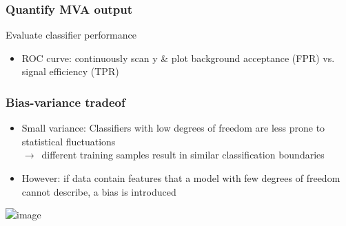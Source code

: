 \documentclass{beamer}
\begin{document}

\begin{frame}
    \frametitle{Quantify MVA output}
    \begin{block}{Evaluate classifier performance}
        \begin{itemize}
            \item ROC curve: continuously scan y \& plot background acceptance (FPR) vs. signal efficiency (TPR)
                
        \end{itemize}
    \end{block}
    \vspace*{2mm}
    \centering{}
\end{frame}


\begin{frame}
    \frametitle{Bias-variance tradeof}
    \begin{itemize}
        \item Small variance: Classifiers with low degrees of freedom are less prone to statistical fluctuations\\$\to$~different training samples result in similar classification boundaries 
        \item However: if data contain features that a model with few degrees of freedom cannot describe, a bias is introduced
    \end{itemize}
    \vspace*{3mm}
    \centering\includegraphics<1>[height=3.0cm,keepaspectratio]{pics/Overfitting}%
\end{frame}
\end{document}

